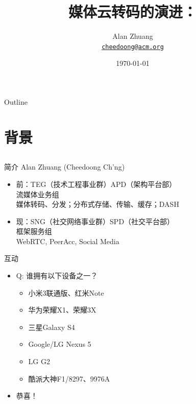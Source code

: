 \documentclass{beamer}
\title{媒体云转码的演进：\\\Small{MapReduce、DASH与稳定婚姻}}
\author{Alan Zhuang\\
\href{mailto:cheedoong@acm.org}{\nolinkurl{cheedoong@acm.org}}\\
}
\date{\today}
\begin{document}

\frame{\titlepage}

\section[Outline]{}
\begin{frame}{Outline}
\tableofcontents
\end{frame}

\section{背景}
\subsection{}
\begin{frame}{简介}
Alan Zhuang (Cheedoong Ch'ng) \pause
\begin{itemize}
\item  前：TEG（技术工程事业群）APD（架构平台部）\\ 流媒体业务组\\
媒体转码、分发；分布式存储、传输、缓存；DASH
\item  现：SNG（社交网络事业群）SPD（社交平台部）\\ 框架服务组\\
WebRTC, PeerAcc, Social  Media
\end{itemize}
\end{frame}
\begin{frame}{互动}
\begin{itemize}
\item Q: 谁拥有以下设备之一？
	\begin{itemize}
	\item 小米3联通版、红米Note
	\item 华为荣耀X1、荣耀3X
	\item 三星Galaxy S4
	\item Google/LG Nexus 5
	\item LG G2
	\item 酷派大神F1/8297、9976A
	\end{itemize}
\item  恭喜！\\
\end{itemize}
\end{frame}
\end{document}
